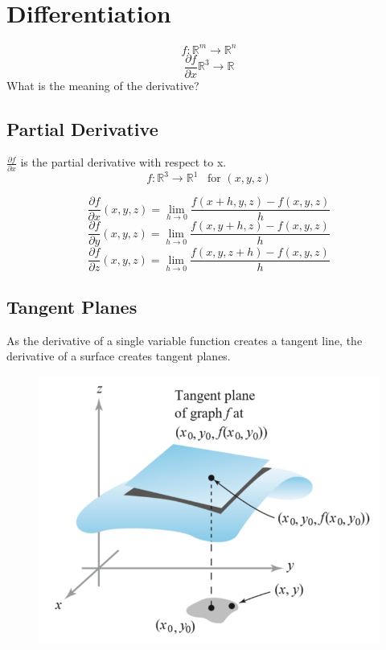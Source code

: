 \documentclass{article}
\begin{document}
\section{Differentiation}
\[f:\mathbb{R}^m\rightarrow\mathbb{R}^n\]
\[\frac{\partial f}{\partial x}\mathbb{R}^3\rightarrow\mathbb{R}\]
What is the meaning of the derivative?

\subsection{Partial Derivative}
$\frac{\partial f}{\partial x}$ is the partial derivative with respect to x.
\[f:\mathbb{R}^3\rightarrow\mathbb{R}^1\;\;\;\mbox{for }(x,y,z)\]

\[\frac{\partial f}{\partial x}(x,y,z)=\lim_{h\rightarrow 0}\frac{f(x+h,y,z)-f(x,y,z)}{h}\]
\[\frac{\partial f}{\partial y}(x,y,z)=\lim_{h\rightarrow 0}\frac{f(x,y+h,z)-f(x,y,z)}{h}\]
\[\frac{\partial f}{\partial z}(x,y,z)=\lim_{h\rightarrow 0}\frac{f(x,y,z+h)-f(x,y,z)}{h}\]

\subsection{Tangent Planes}
As the derivative of a single variable function creates a tangent line, the derivative of a surface creates tangent planes.

\begin{figure}[h!]
    \centering
    \includegraphics[scale=.5]{tangentPlaneDiff.png}
    \caption{}
    \label{}
\end{figure}
\end{document}
